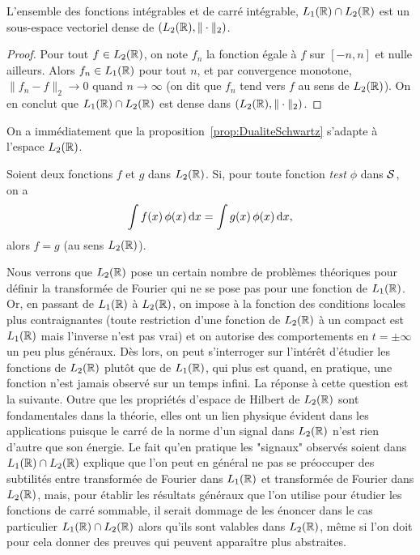 \begin{theorem}
  \label{thm:lunDense}
  L'ensemble des fonctions int{\'e}grables et de carr{\'e} int{\'e}grable, $L_1(\mathbb{R})\cap
  L_2(\mathbb{R})$ est un sous-espace vectoriel dense de $(L_2(\mathbb{R}),\|\cdot\|_2)$.
\end{theorem}
\begin{proof}
Pour tout $f\in L_2(\mathbb{R})$, on note $f_n$ la fonction {\'e}gale {\`a} $f$ sur $[-n,n]$ et nulle ailleurs.
Alors $f_n\in L_1(\mathbb{R})$ pour tout $n$, et par convergence monotone, $\|f_n-f\|_2\to0$ quand $n\to\infty$ (on dit que $f_n$ tend vers $f$ au sens de $L_2(\mathbb{R})$). On en conclut que $L_1(\mathbb{R})\cap L_2(\mathbb{R})$ est dense dans
$(L_2(\mathbb{R}),\|\cdot\|_2)$.
\end{proof}
On a imm{\'e}diatement que la proposition~\ref{prop:DualiteSchwartz} s'adapte {\`a} l'espace $L_2(\mathbb{R})$.
\begin{corollary}  \label{cor:DualiteCalS}
Soient deux fonctions $f$ et $g$ dans $L_2(\mathbb{R})$. Si, pour toute fonction \textit{test} $\phi$ dans $\mathcal{S}$, on a
$$
\int f(x)\,\phi(x)\,\mathrm{d} x= \int g(x)\,\phi(x)\,\mathrm{d} x,
$$
alors $f=g$ (au sens $L_2(\mathbb{R})$).
\end{corollary}

Nous verrons que $L_2(\mathbb{R})$ pose un certain nombre de probl{\`e}mes
th{\'e}oriques pour d{\'e}finir la transform{\'e}e de Fourier qui ne se pose pas
pour une fonction de $L_1(\mathbb{R})$. Or, en passant de $L_1(\mathbb{R})$ {\`a}
$L_2(\mathbb{R})$, on impose {\`a} la fonction des conditions locales plus
contraignantes (toute restriction d'une fonction de $L_2(\mathbb{R})$ {\`a} un compact
est $L_1(\mathbb{R})$ mais l'inverse n'est pas vrai) et on autorise des
comportements en $t=\pm\infty$ un peu plus g{\'e}n{\'e}raux. D{\`e}s lors, on
peut s'interroger sur l'int{\'e}r{\^e}t d'{\'e}tudier les fonctions  de $L_2(\mathbb{R})$ plut{\^o}t que de
$L_1(\mathbb{R})$, qui plus est quand, en pratique, une fonction n'est
jamais observ{\'e} sur un temps infini. La r{\'e}ponse {\`a} cette question est
la suivante. Outre que les propri{\'e}t{\'e}s d'espace de Hilbert de
$L_2(\mathbb{R})$ sont fondamentales dans la th{\'e}orie, elles ont un lien
physique {\'e}vident dans les applications puisque le carr{\'e} de la norme
d'un signal dans $L_2(\mathbb{R})$ n'est rien d'autre que son {\'e}nergie.
Le fait qu'en pratique les "signaux" observ{\'e}s soient dans
$L_1(\mathbb{R})\cap L_2(\mathbb{R})$ explique que l'on peut en g{\'e}n{\'e}ral ne
pas se pr{\'e}occuper des subtilit{\'e}s entre transform{\'e}e de Fourier dans
$L_1(\mathbb{R})$ et transform{\'e}e de Fourier dans $L_2(\mathbb{R})$, mais,
pour {\'e}tablir les r{\'e}sultats g{\'e}n{\'e}raux que l'on utilise pour {\'e}tudier
les fonctions de carr{\'e} sommable, il serait dommage de les {\'e}noncer dans
le cas particulier $L_1(\mathbb{R})\cap L_2(\mathbb{R})$ alors qu'ils sont
valables dans $L_2(\mathbb{R})$, m{\^e}me si l'on doit pour cela donner des
preuves qui peuvent appara{\^i}tre plus abstraites.

